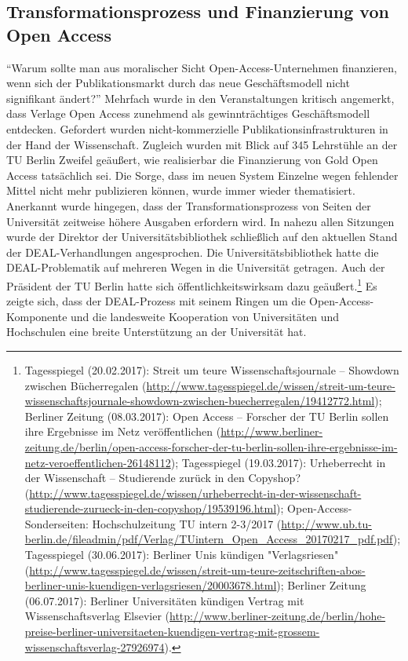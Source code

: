 \documentclass[a4paper,
fontsize=11pt,
oneside,
numbers=noperiodatend,
parskip=half-,
bibliography=totoc,
final
]{scrartcl}
\begin{document}
\hypertarget{transformationsprozess-und-finanzierung-von-open-access}{%
\subsection*{Transformationsprozess und Finanzierung von Open
Access}\label{transformationsprozess-und-finanzierung-von-open-access}}

\enquote{Warum sollte man aus moralischer Sicht Open-Access-Unternehmen
finanzieren, wenn sich der Publikationsmarkt durch das neue
Geschäftsmodell nicht signifikant ändert?} Mehrfach wurde in den
Veranstaltungen kritisch angemerkt, dass Verlage Open Access zunehmend
als gewinnträchtiges Geschäftsmodell entdecken. Gefordert wurden
nicht-kommerzielle Publikationsinfrastrukturen in der Hand der
Wissenschaft. Zugleich wurden mit Blick auf 345 Lehrstühle an der TU
Berlin Zweifel geäußert, wie realisierbar die Finanzierung von Gold Open
Access tatsächlich sei. Die Sorge, dass im neuen System Einzelne wegen
fehlender Mittel nicht mehr publizieren können, wurde immer wieder
thematisiert. Anerkannt wurde hingegen, dass der Transformationsprozess
von Seiten der Universität zeitweise höhere Ausgaben erfordern wird. In
nahezu allen Sitzungen wurde der Direktor der Universitätsbibliothek
schließlich auf den aktuellen Stand der DEAL-Verhandlungen angesprochen.
Die Universitätsbibliothek hatte die DEAL-Problematik auf mehreren Wegen
in die Universität getragen. Auch der Präsident der TU Berlin hatte sich
öffentlichkeitswirksam dazu geäußert.\footnote{Tagesspiegel
  (20.02.2017): Streit um teure Wissenschaftsjournale -- Showdown
  zwischen Bücherregalen
  (\url{http://www.tagesspiegel.de/wissen/streit-um-teure-wissenschaftsjournale-showdown-zwischen-buecherregalen/19412772.html});
  Berliner Zeitung (08.03.2017): Open Access -- Forscher der TU Berlin
  sollen ihre Ergebnisse im Netz veröffentlichen
  (\url{http://www.berliner-zeitung.de/berlin/open-access-forscher-der-tu-berlin-sollen-ihre-ergebnisse-im-netz-veroeffentlichen-26148112});
  Tagesspiegel (19.03.2017): Urheberrecht in der Wissenschaft --
  Studierende zurück in den Copyshop?
  (\url{http://www.tagesspiegel.de/wissen/urheberrecht-in-der-wissenschaft-studierende-zurueck-in-den-copyshop/19539196.html});
  Open-Access-Sonderseiten: Hochschulzeitung TU intern 2-3/2017
  (\url{http://www.ub.tu-berlin.de/fileadmin/pdf/Verlag/TUintern_Open_Access_20170217_pdf.pdf});
  Tagesspiegel (30.06.2017): Berliner Unis kündigen "Verlagsriesen"
  (\url{http://www.tagesspiegel.de/wissen/streit-um-teure-zeitschriften-abos-berliner-unis-kuendigen-verlagsriesen/20003678.html});
  Berliner Zeitung (06.07.2017): Berliner Universitäten kündigen Vertrag
  mit Wissenschaftsverlag Elsevier
  (\url{http://www.berliner-zeitung.de/berlin/hohe-preise-berliner-universitaeten-kuendigen-vertrag-mit-grossem-wissenschaftsverlag-27926974}).}
Es zeigte sich, dass der DEAL-Prozess mit seinem Ringen um die
Open-Access-Komponente und die landesweite Kooperation von Universitäten
und Hochschulen eine breite Unterstützung an der Universität hat.
\end{document}
